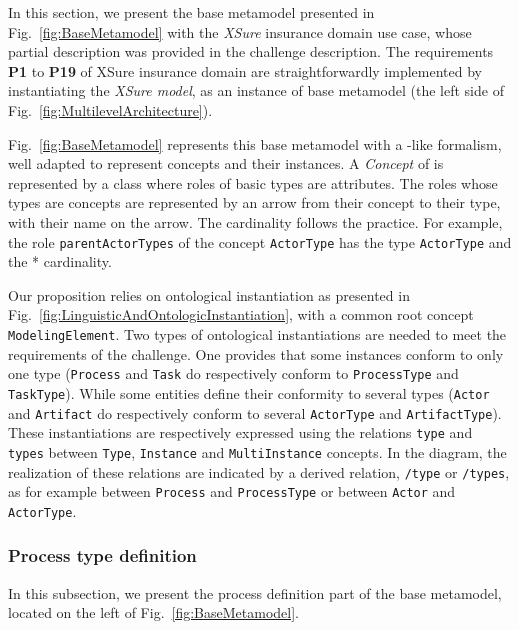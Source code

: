 In this section, we present the base metamodel presented in
Fig.~\ref{fig:BaseMetamodel} with the \textit{XSure} insurance domain use case,
whose partial description was provided in the challenge description. The
requirements \textbf{P1} to \textbf{P19} of XSure insurance domain are
straightforwardly implemented by instantiating the \emph{XSure model}, as an
instance of base metamodel (the left side of
Fig.~\ref{fig:MultilevelArchitecture}).

Fig.~\ref{fig:BaseMetamodel} represents this base metamodel with a \UML-like
formalism, well adapted to represent \FML concepts and their instances. A
\textit{Concept} of \FML is represented by a \UML class where roles of basic
types are attributes. The roles whose types are concepts are represented by an
arrow from their concept to their type, with their name on the arrow. The
cardinality follows the \UML practice.  For example, the role
\texttt{parentActorTypes} of the concept \texttt{ActorType} has the type
\texttt{ActorType} and the * cardinality.

Our proposition relies on ontological instantiation as presented in
Fig.~\ref{fig:LinguisticAndOntologicInstantiation}, with a common root concept
\texttt{ModelingElement}. Two types of ontological instantiations are needed to
meet the requirements of the challenge. One provides that some instances
conform to only one type (\texttt{Process} and \texttt{Task} do respectively
conform to \texttt{ProcessType} and \texttt{TaskType}). While some entities
define their conformity to several types (\texttt{Actor} and \texttt{Artifact}
do respectively conform to several \texttt{ActorType} and
\texttt{ArtifactType}). These instantiations are respectively expressed using
the relations \texttt{type} and \texttt{types} between \texttt{Type},
\texttt{Instance} and \texttt{MultiInstance} concepts. In the diagram, the
realization of these relations are indicated by a derived relation,
\texttt{/type} or \texttt{/types}, as for example between \texttt{Process} and
\texttt{ProcessType} or between \texttt{Actor} and \texttt{ActorType}.

\subsubsection{Process type definition}

In this subsection, we present the process definition part of the base
metamodel, located on the left of Fig.~\ref{fig:BaseMetamodel}.


